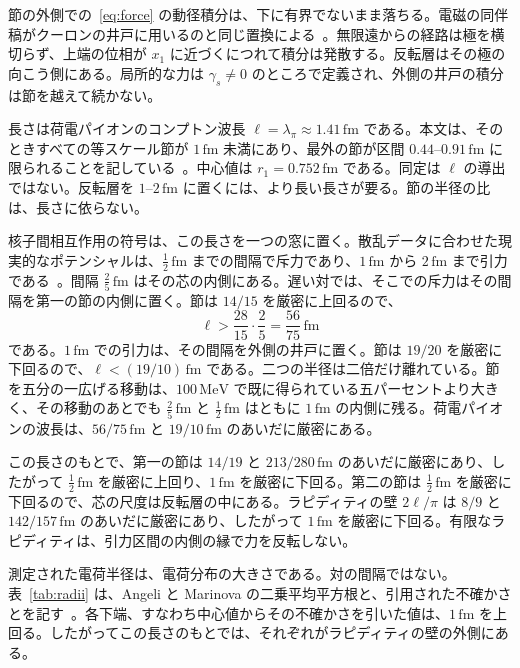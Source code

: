 \documentclass[a4paper]{article}
\begin{document}
節の外側での~\eqref{eq:force} の動径積分は、下に有界でないまま落ちる。電磁の同伴稿がクーロンの井戸に用いるのと同じ置換による~\cite{dst-shell}。無限遠からの経路は極を横切らず、上端の位相が \(x_1\) に近づくにつれて積分は発散する。反転層はその極の向こう側にある。局所的な力は \(\gamma_s\neq 0\) のところで定義され、外側の井戸の積分は節を越えて続かない。

長さは荷電パイオンのコンプトン波長 \(\ell=\lambda_\pi\approx 1.41\,\mathrm{fm}\) である。本文は、そのときすべての等スケール節が \(1\,\mathrm{fm}\) 未満にあり、最外の節が区間 \(0.44\)--\(0.91\,\mathrm{fm}\) に限られることを記している~\cite{dst-main}。中心値は \(r_1=0.752\,\mathrm{fm}\) である。同定は \(\ell\) の導出ではない。反転層を \(1\)--\(2\,\mathrm{fm}\) に置くには、より長い長さが要る。節の半径の比は、長さに依らない。

核子間相互作用の符号は、この長さを一つの窓に置く。散乱データに合わせた現実的なポテンシャルは、\(\tfrac12\,\mathrm{fm}\) までの間隔で斥力であり、\(1\,\mathrm{fm}\) から \(2\,\mathrm{fm}\) まで引力である~\cite{wiringa1995}。間隔 \(\tfrac25\,\mathrm{fm}\) はその芯の内側にある。遅い対では、そこでの斥力はその間隔を第一の節の内側に置く。節は \(14/15\) を厳密に上回るので、
\[
\ell>\frac{28}{15}\cdot\frac{2}{5}=\frac{56}{75}\,\mathrm{fm}
\]
である。\(1\,\mathrm{fm}\) での引力は、その間隔を外側の井戸に置く。節は \(19/20\) を厳密に下回るので、\(\ell<(19/10)\,\mathrm{fm}\) である。二つの半径は二倍だけ離れている。節を五分の一広げる移動は、\(100\,\mathrm{MeV}\) で既に得られている五パーセントより大きく、その移動のあとでも \(\tfrac25\,\mathrm{fm}\) と \(\tfrac12\,\mathrm{fm}\) はともに \(1\,\mathrm{fm}\) の内側に残る。荷電パイオンの波長は、\(56/75\,\mathrm{fm}\) と \(19/10\,\mathrm{fm}\) のあいだに厳密にある。

この長さのもとで、第一の節は \(14/19\) と \(213/280\,\mathrm{fm}\) のあいだに厳密にあり、したがって \(\tfrac12\,\mathrm{fm}\) を厳密に上回り、\(1\,\mathrm{fm}\) を厳密に下回る。第二の節は \(\tfrac12\,\mathrm{fm}\) を厳密に下回るので、芯の尺度は反転層の中にある。ラピディティの壁 \(2\ell/\pi\) は \(8/9\) と \(142/157\,\mathrm{fm}\) のあいだに厳密にあり、したがって \(1\,\mathrm{fm}\) を厳密に下回る。有限なラピディティは、引力区間の内側の縁で力を反転しない。

測定された電荷半径は、電荷分布の大きさである。対の間隔ではない。表~\ref{tab:radii} は、Angeli と Marinova の二乗平均平方根と、引用された不確かさとを記す~\cite{angeli2013}。各下端、すなわち中心値からその不確かさを引いた値は、\(1\,\mathrm{fm}\) を上回る。したがってこの長さのもとでは、それぞれがラピディティの壁の外側にある。
\end{document}
